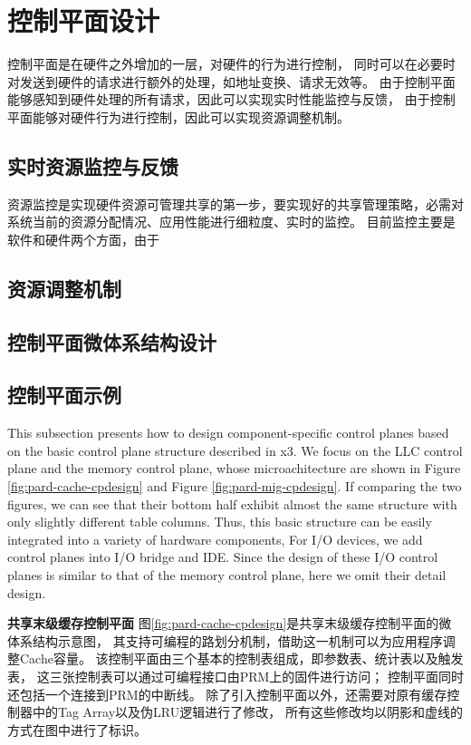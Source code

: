 \section{控制平面设计}

控制平面是在硬件之外增加的一层，对硬件的行为进行控制，
同时可以在必要时对发送到硬件的请求进行额外的处理，如地址变换、请求无效等。
由于控制平面能够感知到硬件处理的所有请求，因此可以实现实时性能监控与反馈，
由于控制平面能够对硬件行为进行控制，因此可以实现资源调整机制。

\subsection{实时资源监控与反馈}
资源监控是实现硬件资源可管理共享的第一步，要实现好的共享管理策略，必需对系统当前的资源分配情况、应用性能进行细粒度、实时的监控。
目前监控主要是软件和硬件两个方面，由于


\subsection{资源调整机制}

\subsection{控制平面微体系结构设计}


\subsection{控制平面示例}

This subsection presents how to design component-specific control
planes based on the basic control plane structure described in
x3. We focus on the LLC control plane and the memory control
plane, whose microachitecture are shown in Figure \ref{fig:pard-cache-cpdesign}
and Figure \ref{fig:pard-mig-cpdesign}.
If comparing the two figures, we can see that their bottom half
exhibit almost the same structure with only slightly different table
columns. Thus, this basic structure can be easily integrated into a
variety of hardware components,
For I/O devices, we add control planes into I/O bridge and IDE.
Since the design of these I/O control planes is similar to that of the
memory control plane, here we omit their detail design.

\textbf{共享末级缓存控制平面}\quad
图\ref{fig:pard-cache-cpdesign}是共享末级缓存控制平面的微体系结构示意图，
其支持可编程的路划分机制，借助这一机制可以为应用程序调整Cache容量。
该控制平面由三个基本的控制表组成，即参数表、统计表以及触发表，
这三张控制表可以通过可编程接口由PRM上的固件进行访问；
控制平面同时还包括一个连接到PRM的中断线。
除了引入控制平面以外，还需要对原有缓存控制器中的Tag Array以及伪LRU逻辑进行了修改，
所有这些修改均以阴影和虚线的方式在图中进行了标识。

